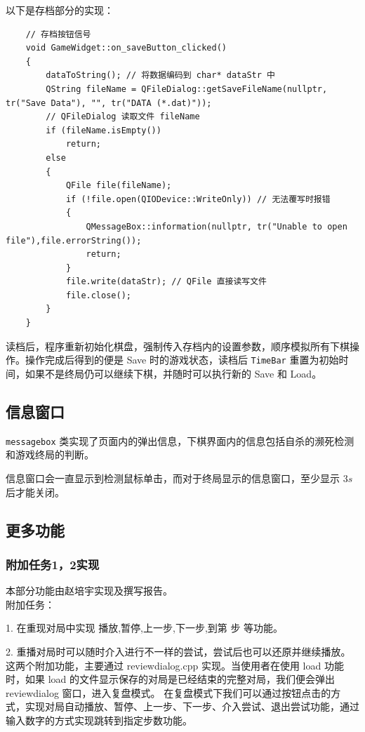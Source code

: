\documentclass{noithesis}
\begin{document}
	以下是存档部分的实现：
	
	\begin{lstlisting}
	// 存档按钮信号
	void GameWidget::on_saveButton_clicked()
	{
		dataToString(); // 将数据编码到 char* dataStr 中
		QString fileName = QFileDialog::getSaveFileName(nullptr, tr("Save Data"), "", tr("DATA (*.dat)"));
		// QFileDialog 读取文件 fileName
		if (fileName.isEmpty())
			return;
		else
		{
			QFile file(fileName);
			if (!file.open(QIODevice::WriteOnly)) // 无法覆写时报错
			{
				QMessageBox::information(nullptr, tr("Unable to open file"),file.errorString());
				return;
			}
			file.write(dataStr); // QFile 直接读写文件
			file.close();
		}
	}
	\end{lstlisting}
	
	读档后，程序重新初始化棋盘，强制传入存档内的设置参数，顺序模拟所有下棋操作。操作完成后得到的便是 Save 时的游戏状态，读档后 \verb|TimeBar| 重置为初始时间，如果不是终局仍可以继续下棋，并随时可以执行新的 Save 和 Load。
	
	\subsection{信息窗口}
	
	\verb|messagebox| 类实现了页面内的弹出信息，下棋界面内的信息包括自杀的濒死检测和游戏终局的判断。
	
	信息窗口会一直显示到检测鼠标单击，而对于终局显示的信息窗口，至少显示 $3s$ 后才能关闭。
	
	\subsection{更多功能}

	\subsubsection{附加任务1，2实现}
	本部分功能由赵培宇实现及撰写报告。	
	\\
	
	附加任务：
	
	1. 在重现对局中实现 播放,暂停,上一步,下一步,到第 步 等功能。
	
	2. 重播对局时可以随时介入进行不一样的尝试，尝试后也可以还原并继续播放。
	\\	
	
	这两个附加功能，主要通过 reviewdialog.cpp 实现。当使用者在使用 load 功能时，如果 load 的文件显示保存的对局是已经结束的完整对局，我们便会弹出 reviewdialog 窗口，进入复盘模式。
    在复盘模式下我们可以通过按钮点击的方式，实现对局自动播放、暂停、上一步、下一步、介入尝试、退出尝试功能，通过输入数字的方式实现跳转到指定步数功能。
    \\
    
\end{document}
